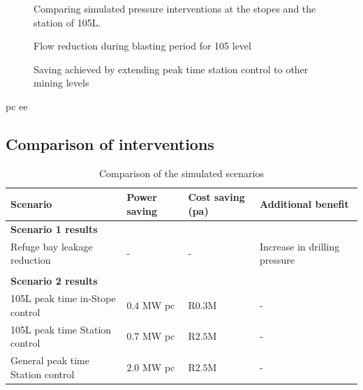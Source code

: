 	\begin{figure}[h!]
		\centering
		
		\caption{Comparing simulated pressure interventions at the stopes and the station of 105L.}
		\label{fig: Station vs stope}
	\end{figure}

\begin{figure}[h!]
	\centering
	
	\caption{Flow reduction during blasting period for 105 level}
	\label{fig: 105 Flow savings}
\end{figure}

\begin{figure}[h!]
	\centering
	
	\caption{Saving achieved by extending peak time station control to other mining levels}
	\label{fig: General station optimise}
\end{figure}

	\gls{pc}  \gls{ee} 
	\subsection{Comparison of interventions}
	
	\begin{table}[h]
		\centering
		\begin{tabular}{p{}
				p{}
				p{}
				p{}}
			\hline 
			 \vspace{0.5em}Scenario  &  \vspace{0.5em}Power saving &  Cost saving (\gls{pa}) &  \vspace{0.5em}Additional benefit  \\
			\hline
			\multicolumn{4}{l}{\textbf{Scenario 1 results}} \\
			Refuge bay leakage reduction & - & - & Increase in drilling pressure \\
			 \\
			\multicolumn{4}{l}{\textbf{Scenario 2 results}}  \\
			105L peak time in-Stope control & $ 0.4 $ MW \gls{pc} & R$ 0.3 $M& - \\
			105L peak time Station control & $ 0.7 $ MW \gls{pc} & R$ 2.5 $M& - \\
			General peak time Station control & $ 2.0 $ MW \gls{pc} & R$ 2.5 $M& - \\
			\hline 
		\end{tabular}
		\caption{Comparison of the simulated scenarios}
		\label{Table: B Comparison}
	\end{table}

